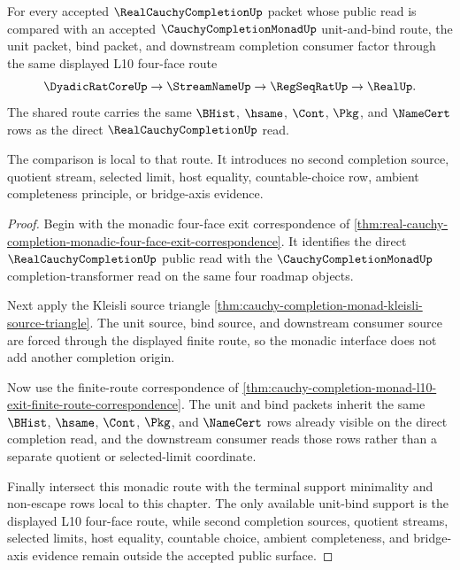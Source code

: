 \begin{theorem}
\label{thm:real-cauchy-completion-monadic-unit-bind-locality}
For every accepted $\RealCauchyCompletionUp$ packet whose public read is compared with an accepted $\CauchyCompletionMonadUp$ unit-and-bind route, the unit packet, bind packet, and downstream completion consumer factor through the same displayed L10 four-face route
$$
\DyadicRatCoreUp \to \StreamNameUp \to \RegSeqRatUp \to \RealUp .
$$
The shared route carries the same $\BHist$, $\hsame$, $\Cont$, $\Pkg$, and $\NameCert$ rows as the direct $\RealCauchyCompletionUp$ read.

The comparison is local to that route. It introduces no second completion source, quotient stream, selected limit, host equality, countable-choice row, ambient completeness principle, or bridge-axis evidence.
\end{theorem}
\begin{proof}
Begin with the monadic four-face exit correspondence of \autoref{thm:real-cauchy-completion-monadic-four-face-exit-correspondence}. It identifies the direct $\RealCauchyCompletionUp$ public read with the $\CauchyCompletionMonadUp$ completion-transformer read on the same four roadmap objects.

Next apply the Kleisli source triangle \autoref{thm:cauchy-completion-monad-kleisli-source-triangle}. The unit source, bind source, and downstream consumer source are forced through the displayed finite route, so the monadic interface does not add another completion origin.

Now use the finite-route correspondence of \autoref{thm:cauchy-completion-monad-l10-exit-finite-route-correspondence}. The unit and bind packets inherit the same $\BHist$, $\hsame$, $\Cont$, $\Pkg$, and $\NameCert$ rows already visible on the direct completion read, and the downstream consumer reads those rows rather than a separate quotient or selected-limit coordinate.

Finally intersect this monadic route with the terminal support minimality and non-escape rows local to this chapter. The only available unit-bind support is the displayed L10 four-face route, while second completion sources, quotient streams, selected limits, host equality, countable choice, ambient completeness, and bridge-axis evidence remain outside the accepted public surface.
\end{proof}

